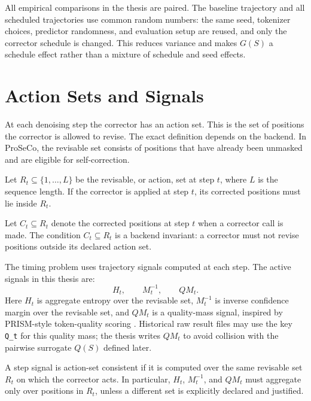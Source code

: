 All empirical comparisons in the thesis are paired. The baseline trajectory
and all scheduled trajectories use common random numbers: the same seed,
tokenizer choices, predictor randomness, and evaluation setup are reused, and
only the corrector schedule is changed. This reduces variance and makes
$G(S)$ a schedule effect rather than a mixture of schedule and seed effects.

\section{Action Sets and Signals}
\label{sec:ch6-action-signals}

At each denoising step the corrector has an action set. This is the set of
positions the corrector is allowed to revise. The exact definition depends on
the backend. In ProSeCo, the revisable set consists of positions that have
already been unmasked and are eligible for self-correction.

\begin{definition}
\label{def:ch6-action-set}
Let $R_t \subseteq \{1,\ldots,L\}$ be the revisable, or action, set at step
$t$, where $L$ is the sequence length. If the corrector is applied at step
$t$, its corrected positions must lie inside $R_t$.
\end{definition}

Let $C_t \subseteq R_t$ denote the corrected positions at step $t$ when a
corrector call is made. The condition $C_t\subseteq R_t$ is a backend
invariant: a corrector must not revise positions outside its declared action
set.

The timing problem uses trajectory signals computed at each step. The active
signals in this thesis are:
\[
  H_t,\qquad M_t^{-1},\qquad QM_t .
\]
Here $H_t$ is aggregate entropy over the revisable set, $M_t^{-1}$ is inverse
confidence margin over the revisable set, and $QM_t$ is a quality-mass signal,
inspired by PRISM-style token-quality scoring \parencite{kim2025prism}.
Historical raw result files may use the key \texttt{Q\_t} for this quality
mass; the thesis writes $QM_t$ to avoid collision with the pairwise surrogate
$Q(S)$ defined later.

\begin{definition}
\label{def:ch6-signal-consistency}
A step signal is action-set consistent if it is computed over the same
revisable set $R_t$ on which the corrector acts. In particular, $H_t$,
$M_t^{-1}$, and $QM_t$ must aggregate only over positions in $R_t$, unless a
different set is explicitly declared and justified.
\end{definition}

